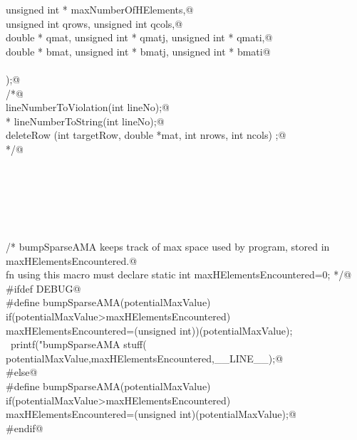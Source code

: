 \documentclass[12pt]{article}
\begin{document}
\begin{flushleft}
\begin{minipage}{\linewidth}
\begin{list}{}{}
\mbox{}\verb@  unsigned int * maxNumberOfHElements,@\\
\mbox{}\verb@  unsigned int qrows, unsigned int qcols,@\\
\mbox{}\verb@  double * qmat, unsigned int * qmatj, unsigned int * qmati,@\\
\mbox{}\verb@  double * bmat, unsigned int * bmatj,  unsigned int * bmati@\\
\mbox{}\verb@@\\
\mbox{}\verb@);@\\
\mbox{}\verb@/*@\\
\mbox{}\verb@int lineNumberToViolation(int lineNo);@\\
\mbox{}\verb@char * lineNumberToString(int lineNo);@\\
\mbox{}\verb@int deleteRow (int targetRow, double *mat, int nrows, int ncols) ;@\\
\mbox{}\verb@*/@\\
\mbox{}\verb@@\\
\mbox{}\verb@@\\
\mbox{}\verb@@\\
\mbox{}\verb@@\\
\mbox{}\verb@@\\
\mbox{}\verb@@\\
\mbox{}\verb@/* bumpSparseAMA keeps track of max space used by program, stored in maxHElementsEncountered.@\\
\mbox{}\verb@any fn using this macro must declare static int maxHElementsEncountered=0; */@\\
\mbox{}\verb@#ifdef DEBUG@\\
\mbox{}\verb@#define bumpSparseAMA(potentialMaxValue) \@\\
\mbox{}\verb@        if(potentialMaxValue>maxHElementsEncountered) \@\\
\mbox{}\verb@        maxHElementsEncountered=(unsigned int))(potentialMaxValue);     \       printf("bumpSparseAMA stuff(%d,%d) at line %d\n", \@\\
\mbox{}\verb@        potentialMaxValue,maxHElementsEncountered,__LINE__);@\\
\mbox{}\verb@#else@\\
\mbox{}\verb@#define bumpSparseAMA(potentialMaxValue) \@\\
\mbox{}\verb@   if(potentialMaxValue>maxHElementsEncountered) \@\\
\mbox{}\verb@     maxHElementsEncountered=(unsigned int)(potentialMaxValue);@\\
\mbox{}\verb@#endif@\\

\end{list}
\end{minipage}
\end{flushleft}
\end{document}
